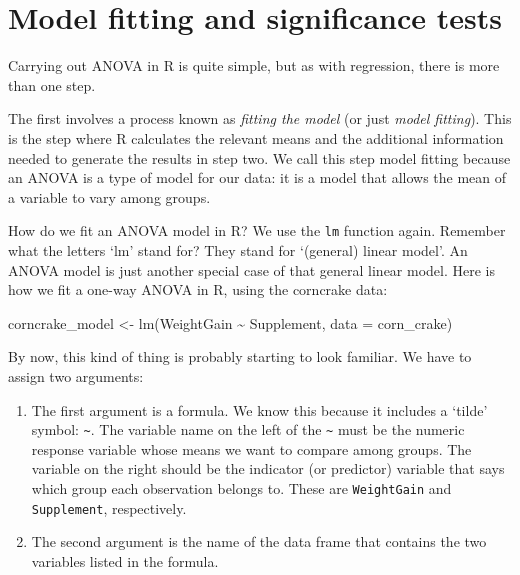 \documentclass[
]{book}
\newenvironment{Shaded}{\begin{snugshade}}{\end{snugshade}}
\newcommand{\AttributeTok}[1]{\textcolor[rgb]{0.77,0.63,0.00}{#1}}
\newcommand{\FunctionTok}[1]{\textcolor[rgb]{0.00,0.00,0.00}{#1}}
\newcommand{\NormalTok}[1]{#1}
\newcommand{\OtherTok}[1]{\textcolor[rgb]{0.56,0.35,0.01}{#1}}
\newcommand{\SpecialCharTok}[1]{\textcolor[rgb]{0.00,0.00,0.00}{#1}}
\begin{document}
\hypertarget{model-fitting-and-significance-tests-1}{%
\section{Model fitting and significance tests}\label{model-fitting-and-significance-tests-1}}

Carrying out ANOVA in R is quite simple, but as with regression, there is more than one step.

The first involves a process known as \emph{fitting the model} (or just \emph{model fitting}). This is the step where R calculates the relevant means and the additional information needed to generate the results in step two. We call this step model fitting because an ANOVA is a type of model for our data: it is a model that allows the mean of a variable to vary among groups.

How do we fit an ANOVA model in R? We use the \texttt{lm} function again. Remember what the letters `lm' stand for? They stand for `(general) linear model'. An ANOVA model is just another special case of that general linear model. Here is how we fit a one-way ANOVA in R, using the corncrake data:

\begin{Shaded}
\begin{Highlighting}[]
\NormalTok{corncrake\_model }\OtherTok{\textless{}{-}} \FunctionTok{lm}\NormalTok{(WeightGain }\SpecialCharTok{\textasciitilde{}}\NormalTok{ Supplement, }\AttributeTok{data =}\NormalTok{ corn\_crake)}
\end{Highlighting}
\end{Shaded}

By now, this kind of thing is probably starting to look familiar. We have to assign two arguments:

\begin{enumerate}
\def\labelenumi{\arabic{enumi}.}
\item
  The first argument is a formula. We know this because it includes a `tilde' symbol: \texttt{\textasciitilde{}}. The variable name on the left of the \texttt{\textasciitilde{}} must be the numeric response variable whose means we want to compare among groups. The variable on the right should be the indicator (or predictor) variable that says which group each observation belongs to. These are \texttt{WeightGain} and \texttt{Supplement}, respectively.
\item
  The second argument is the name of the data frame that contains the two variables listed in the formula.
\end{enumerate}
\end{document}
